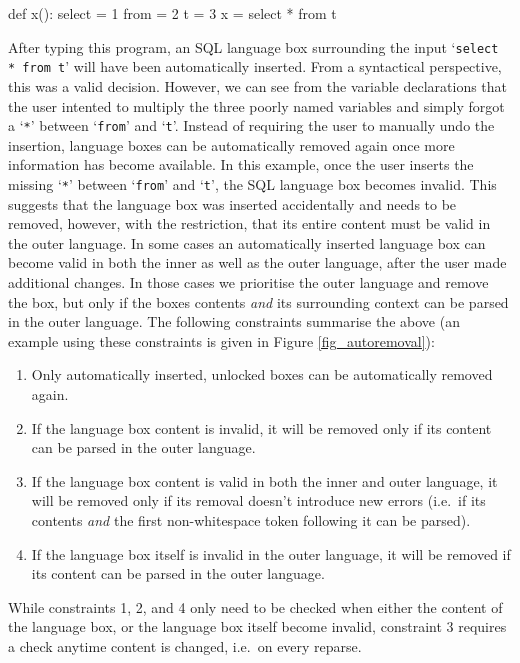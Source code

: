 \documentclass[sigplan,screen]{acmart}\settopmatter{printfolios=true,printccs=false,printacmref=false}
\newcommand{\qtt}[1]{`\texttt{#1}'\xspace}
\begin{document}
\begin{lstdefault}[language=Python]
  def x():
    select = 1
    from = 2
    t = 3
    x = select * from t
\end{lstdefault}
\vspace{1em}

After typing this program, an SQL language box surrounding the input
\qtt{select * from t} will have been automatically inserted. From a syntactical
perspective, this was a valid decision. However, we can see from the variable
declarations that the user intented to multiply the three poorly named
variables and simply forgot a \qtt{*} between \qtt{from} and \qtt{t}.
Instead of requiring the user to manually undo the insertion, language boxes
can be automatically removed again once more information has
become available.  In this example, once the user inserts the missing \qtt{*}
between \qtt{from} and \qtt{t}, the SQL language box becomes invalid. This
suggests that the language box was inserted accidentally and needs
to be removed, however, with the restriction, that its entire content must be valid in
the outer language.
In some cases an automatically inserted language box can become valid in
both the inner as well as the outer language, after the user made additional
changes.  In those cases we prioritise the outer language and remove the
box, but only if the boxes contents \emph{and} its surrounding context can be
parsed in the outer language. The following constraints summarise the above
(an example using these constraints is given in Figure \ref{fig_autoremoval}):
\begin{enumerate}
  \item Only automatically inserted, unlocked boxes can be automatically removed again.
  \item If the language box content is invalid, it will be removed only if
        its content can be parsed in the outer language.
  \item If the language box content is valid in both the inner and outer
    language, it will be removed only if its removal doesn't introduce new errors (i.e.~if its contents \emph{and} the first non-whitespace token following it
    can be parsed).
  \item If the language box itself is invalid in the outer language, it will be removed
      if its content can be parsed in the outer language.
\end{enumerate}

While constraints 1, 2, and 4 only need to be checked when either the content of
the language box, or the language box itself become invalid, constraint 3 requires
a check anytime content is changed, i.e.~on every reparse.
\end{document}
